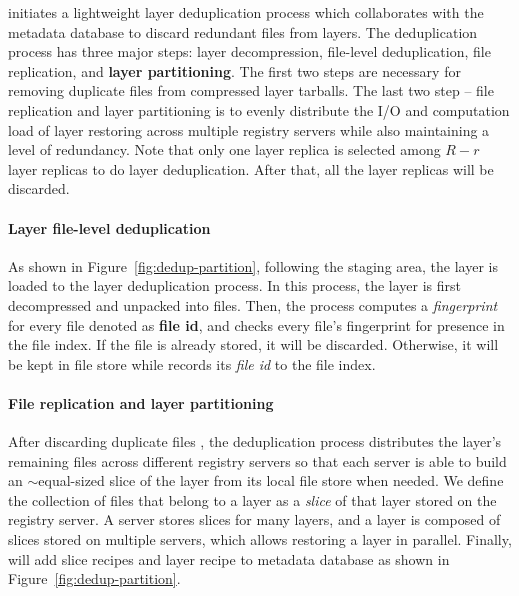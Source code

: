  \sysname initiates a lightweight layer deduplication process which collaborates with the metadata database
 to discard redundant files from layers. 
The deduplication process has three major steps: 
layer decompression, 
file-level deduplication,
file replication,
and \textbf{layer partitioning}. 
The first two steps are necessary for removing duplicate files from compressed layer tarballs.
The last two step -- file replication and layer partitioning is 
to evenly distribute the I/O and computation load of layer restoring across multiple registry servers 
while also maintaining a level of redundancy.  
Note that only one layer replica is selected among $R-r$ layer replicas to do layer deduplication. %
After that, all the layer replicas will be discarded.  



%
\paragraph{Layer file-level deduplication}
As shown in Figure~\ref{fig:dedup-partition}, 
following the staging area, the layer is loaded to the layer deduplication process.
In this process, the layer is first decompressed and unpacked into files.
Then, 
the process computes a \emph{fingerprint} for every file denoted as \textbf{file id}, 
and checks every file's fingerprint for presence in the file index.
If the file is already stored, it will be discarded. 
Otherwise, it will be kept in file store while
\sysname records its \emph{file id} to the file index.

\paragraph{File replication and layer partitioning}

After discarding duplicate files
, the deduplication process distributes the layer's remaining files across different registry servers
so that each server is able to build an $\sim$equal-sized %
 slice of the layer from its local file store when needed.
 We define the collection of files that belong to a layer as a \emph{slice} of that layer stored on the registry server. 
A server stores slices for many layers, and a layer is composed of slices stored on multiple servers, which allows restoring a layer in parallel. 
Finally, \sysname will add slice recipes and layer recipe to metadata database as shown in Figure~\ref{fig:dedup-partition}.

